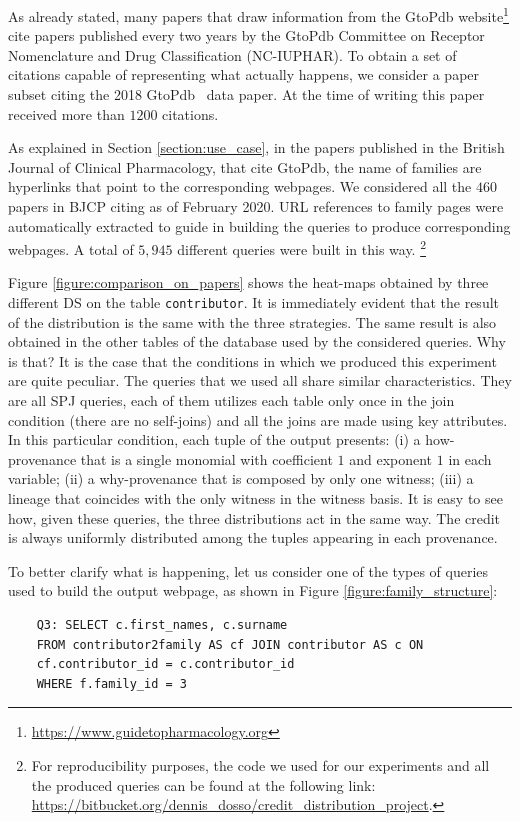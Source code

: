 As already stated, many papers that draw information from the GtoPdb website\footnote{\url{https://www.guidetopharmacology.org}} cite papers published every two years by the GtoPdb Committee on Receptor Nomenclature and Drug Classification (NC-IUPHAR).
To obtain a set of citations capable of representing what actually happens, we consider a paper subset citing the 2018 GtoPdb~\citep{iuphar2018} data paper. 
At the time of writing this paper received more than $1200$ citations. 

As explained in Section \ref{section:use_case}, in the papers published in the British Journal of Clinical Pharmacology, that cite GtoPdb, the name of families are hyperlinks that point to the corresponding webpages.
We considered all the $460$ papers in BJCP citing \citep{iuphar2018} as of February 2020. 
URL references to family pages were automatically extracted to guide in building the queries to produce corresponding webpages.
A total of $5,945$ different queries were built in this way. \footnote{For reproducibility purposes, the code we used for our experiments and all the produced queries can be found at the following link: \url{https://bitbucket.org/dennis_dosso/credit_distribution_project}.}

Figure \ref{figure:comparison_on_papers} shows the heat-maps obtained by three different DS on the table \texttt{contributor}.
It is immediately evident that the result of the distribution is the same with the three strategies. The same result is also obtained in the other tables of the database used by the considered queries. 
Why is that? 
It is the case that the conditions in which we produced this experiment are quite peculiar. The queries that we used all share similar characteristics. They are all SPJ queries, each of them utilizes each table only once in the join condition (there are no self-joins) and all the joins are made using key attributes. 
In this particular condition, each tuple of the output presents: (i) a how-provenance that is a single monomial with coefficient $1$ and exponent $1$ in each variable; (ii) a why-provenance that is composed by only one witness; (iii) a lineage that coincides with the only witness in the witness basis.
It is easy to see how, given these queries, the three distributions act in the same way.
The credit is always uniformly distributed among the tuples appearing in each provenance. 

To better clarify what is happening, let us consider one of the types of queries used to build the output webpage, as shown in Figure \ref{figure:family_structure}:
\begin{verbatim}
	Q3: SELECT c.first_names, c.surname
	FROM contributor2family AS cf JOIN contributor AS c ON 
	cf.contributor_id = c.contributor_id 
	WHERE f.family_id = 3
\end{verbatim}

